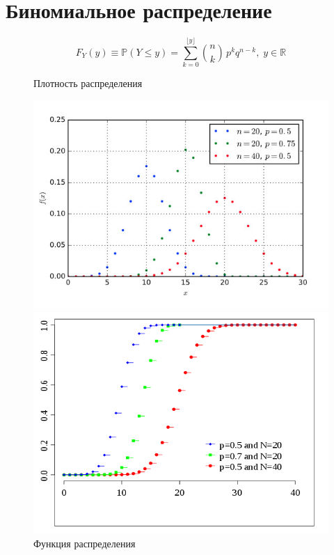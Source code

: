 \documentclass[a4paper,12pt,answers,noaddpoints]{exam}
\begin{document}
\section{Биномиальное распределение}
\begin{equation}
    F_Y(y) \equiv \mathbb{P}(Y \leqslant y) = \sum\limits_{k=0}^{\lfloor y \rfloor} \binom{n}{k}\, p^k q^{n-k},\; y \in\mathbb{R}
\end{equation}
\begin{figure}[h]
\centering
\begin{minipage}[h]{0.9\linewidth}
\caption{Плотность распределения}
\includegraphics[width=0.7\linewidth]{1.jpg}
\end{minipage}
\vfill
\begin{minipage}[h]{0.9\linewidth}
\caption{Функция распределения}
\includegraphics[width=0.7\linewidth]{2.png}
\end{minipage}
\end{figure}

\pagebreak
\end{document}
